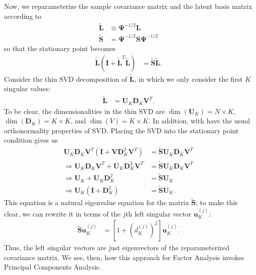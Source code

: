 \documentclass[12pt]{article}
\begin{document}
Now, we reparameterize the sample covariance matrix and the latent basis matrix according to
\begin{align}
	\tilde{\mathbf{L}} &\equiv \boldsymbol{\Psi}^{-1/2}\mathbf{L}\\
	\tilde{\mathbf{S}} &= \boldsymbol{\Psi}^{-1/2} \mathbf{S} \boldsymbol{\Psi}^{-1/2} 
\end{align}
so that the stationary point becomes
\begin{align}
	\tilde{\mathbf{L}}(\mathbf{I} + \tilde{\mathbf{L}}^T \tilde{\mathbf{L}}) &= \tilde{\mathbf{S}}\tilde{\mathbf{L}}.
\end{align}
Consider the thin SVD decomposition of $\tilde{\mathbf{L}}$, in which we only consider the first $K$ singular values:
\begin{align}
	\tilde{\mathbf{L}} &= \mathbf{U}_K \mathbf{D}_K \mathbf{V}^T.
\end{align}
To be clear, the dimensionalities in the thin SVD are $\dim(\mathbf{U}_K) = N\times K$, $\dim(\mathbf{D}_K) = K\times K$, and $\dim(V) = K\times K$. In addition, with have the usual orthonormality properties of SVD. Placing the SVD into the stationary point condition gives us
\begin{align}
	\mathbf{U}_K \mathbf{D}_K \mathbf{V}^T \left(\mathbf{I} + \mathbf{V} \mathbf{D}_K^2 \mathbf{V}^T\right) &= \tilde{\mathbf{S}} \mathbf{U}_K \mathbf{D}_K \mathbf{V}^T \\
	\Rightarrow \mathbf{U}_K \mathbf{D}_K \mathbf{V}^T + \mathbf{U}_K \mathbf{D}_K^3 \mathbf{V}^T &=  \tilde{\mathbf{S}} \mathbf{U}_K \mathbf{D}_K \mathbf{V}^T \\
	 \Rightarrow \mathbf{U}_K + \mathbf{U}_K \mathbf{D}_K^2 &= \tilde{\mathbf{S}} \mathbf{U}_K \\
	 \Rightarrow \mathbf{U}_K \left(\mathbf{I} + \mathbf{D}_K^2\right) &= \tilde{\mathbf{S}} \mathbf{U}_K.
\end{align}
This equation is a natural eigenvalue equation for the matrix $\tilde{\mathbf{S}}$; to make this clear, we can rewrite it in terms of the $j$th left singular vector $\mathbf{u}_K^{(j)}$:
\begin{align}
\tilde{\mathbf{S}} \mathbf{u}_K^{(j)} &= \left[1 + \left(d_K^{(j)}\right)^2\right] \mathbf{u}_K^{(j)}.
\end{align}
Thus, the left singular vectors are just  eigenvectors of the reparameterized covariance matrix. We see, then, how this approach for Factor Analysis invokes Principal Components Analysis. 
\end{document}
